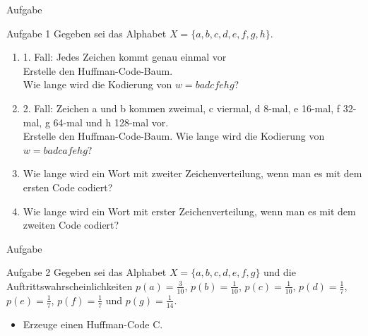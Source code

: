 \begin{frame}{Aufgabe}
	\begin{block}{Aufgabe 1}
    		Gegeben sei das Alphabet $X=\{a,b,c,d,e,f,g,h\}$.
    		\begin{enumerate}
			\item 1. Fall: Jedes Zeichen kommt genau einmal vor \\ Erstelle den Huffman-Code-Baum.\\
				\pause Wie lange wird die Kodierung von $w=badcfehg$? \pause
			\item 2. Fall: Zeichen a und b kommen zweimal, c viermal, d 8-mal, e 16-mal, f 32-mal, g 64-mal und h 128-mal vor. \\ Erstelle den Huffman-Code-Baum. Wie lange wird die Kodierung von $w=badcafehg$? \pause
			\item Wie lange wird ein Wort mit zweiter Zeichenverteilung, wenn man es mit dem ersten Code codiert?
			\item Wie lange wird ein Wort mit erster Zeichenverteilung, wenn man es mit dem zweiten Code codiert?
		\end{enumerate}
    	\end{block}

\end{frame}

\begin{frame}{Aufgabe}
	\begin{block}{Aufgabe 2}
    		Gegeben sei das Alphabet $X=\{a,b,c,d,e,f,g\}$ und die Auftrittswahrscheinlichkeiten $p(a)=\frac{3}{10}$, $p(b)=\frac{1}{10}$, $p(c)=\frac{1}{10}$, $p(d)=\frac{1}{7}$, $p(e)=\frac{1}{7}$, $p(f)=\frac{1}{7}$ und $p(g)=\frac{1}{14}$.
    		\begin{itemize}
			\item Erzeuge einen Huffman-Code C.
		\end{itemize}
    	\end{block}
\end{frame}

